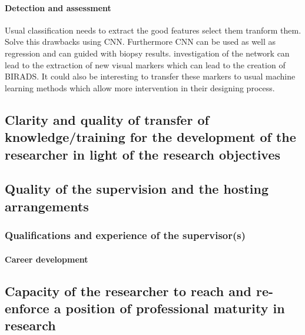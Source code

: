 \paragraph{Detection and assessment}

Usual classification needs to extract the good features select them tranform them.
Solve this drawbacks using CNN.
Furthermore CNN can be used as well as regression and can guided with biopsy results.
investigation of the network can lead to the extraction of new visual markers which can lead to the creation of BIRADS.
It could also be interesting to transfer these markers to usual machine learning methods which allow more intervention in their designing process.


\subsection{Clarity and quality of transfer of knowledge/training for the development of the researcher in light of the research objectives}
\label{sec:transfer}


\subsection{Quality of the supervision and the hosting arrangements}
\label{sec:supervision}

\subsubsection*{Qualifications and experience of the supervisor(s)}


\paragraph{Career development}

\subsection{Capacity of the researcher to reach and re-enforce a position of professional maturity in research}
\label{sec:maturity}
